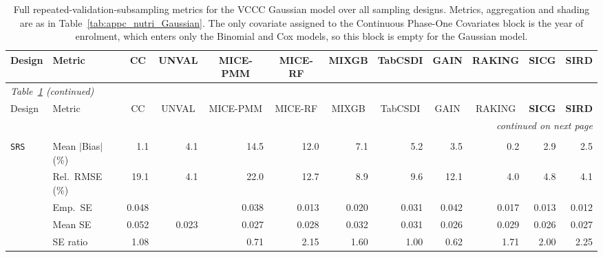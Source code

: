 \begin{landscape}
\footnotesize\setlength{\tabcolsep}{3.5pt}
\begin{longtable}{llrrrrrrrrrr}
\caption{Full repeated-validation-subsampling metrics for the VCCC Gaussian model over all sampling designs. Metrics, aggregation and shading are as in Table~\ref{tab:appc_nutri_Gaussian}. The only covariate assigned to the Continuous Phase-One Covariates block is the year of enrolment, which enters only the Binomial and Cox models, so this block is empty for the Gaussian model.}
\label{tab:appc_vccc_LM} \\
\toprule
Design & Metric & \multicolumn{1}{c}{CC} & \multicolumn{1}{c}{UNVAL} & \multicolumn{1}{c}{MICE-PMM} & \multicolumn{1}{c}{MICE-RF} & \multicolumn{1}{c}{MIXGB} & \multicolumn{1}{c}{TabCSDI} & \multicolumn{1}{c}{GAIN} & \multicolumn{1}{c}{RAKING} & \multicolumn{1}{c}{\textbf{SICG}} & \multicolumn{1}{c}{\textbf{SIRD}} \\
\midrule
\endfirsthead
\multicolumn{12}{l}{\footnotesize\itshape Table~\ref{tab:appc_vccc_LM} (continued)} \\
\toprule
Design & Metric & \multicolumn{1}{c}{CC} & \multicolumn{1}{c}{UNVAL} & \multicolumn{1}{c}{MICE-PMM} & \multicolumn{1}{c}{MICE-RF} & \multicolumn{1}{c}{MIXGB} & \multicolumn{1}{c}{TabCSDI} & \multicolumn{1}{c}{GAIN} & \multicolumn{1}{c}{RAKING} & \multicolumn{1}{c}{\textbf{SICG}} & \multicolumn{1}{c}{\textbf{SIRD}} \\
\midrule
\endhead
\midrule \multicolumn{12}{r}{\footnotesize\itshape continued on next page} \\
\endfoot
\bottomrule
\endlastfoot
\multicolumn{12}{l}{\textbf{Continuous Phase-Two Covariates}} \\
\addlinespace[2pt]
\quad \texttt{SRS} & Mean $|$Bias$|$ (\%) & \cellcolor{ranktwo}1.1 & 4.1 & 14.5 & 12.0 & 7.1 & 5.2 & 3.5 & \cellcolor{rankone}0.2 & 2.9 & \cellcolor{rankthree}2.5 \\
 & Rel.\ RMSE (\%) & 19.1 & \cellcolor{ranktwo}4.1 & 22.0 & 12.7 & 8.9 & 9.6 & 12.1 & \cellcolor{rankone}4.0 & \cellcolor{rankthree}4.8 & \cellcolor{ranktwo}4.1 \\
 & Emp.\ SE & 0.048 &  & 0.038 & 0.013 & 0.020 & 0.031 & 0.042 & 0.017 & 0.013 & 0.012 \\
 & Mean SE & 0.052 & 0.023 & 0.027 & 0.028 & 0.032 & 0.031 & 0.026 & 0.029 & 0.026 & 0.027 \\
 & SE ratio & \cellcolor{ranktwo}1.08 &  & \cellcolor{rankthree}0.71 & 2.15 & 1.60 & \cellcolor{rankone}1.00 & 0.62 & 1.71 & 2.00 & 2.25 \\

\end{longtable}
\end{landscape}
